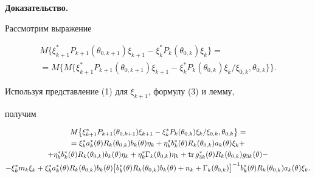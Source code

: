 {\bf Доказательство.}


Рассмотрим выражение


\begin{gather*}


M\bigl\{\xi_{k+1}^{*}P_{k+1}(\theta_{0,k+1})\xi_{k+1}-


\xi_{k}^{*}P_{k}(\theta_{0,k})\xi_{k}\bigr\}=\\


%


=M\bigl\{M\bigl\{\xi_{k+1}^{*}P_{k+1}(\theta_{0,k+1})\xi_{k+1}-


\xi_{k}^{*}P_{k}(\theta_{0,k})\xi_{k}/


\xi_{0,k},\theta_{0,k}\bigr\}\bigr\}.


\end{gather*}


Используя представление (1) для $\xi_{k+1}$, формулу (3) и лемму,


получим


\begin{gather*}


M\bigl\{\xi_{k+1}^{*}P_{k+1}(\theta_{0,k+1})\xi_{k+1}-


\xi_{k}^{*}P_{k}(\theta_{0,k})\xi_{k}/\xi_{0,k},


\theta_{0,k}\bigr\}=\\


%


=\xi_{k}^{*}a_{k}^{*}(\theta)R_{k}(\theta_{0,k})


b_{k}(\theta)\eta_{k}+


\eta_{k}^{*}b_{k}^{*}(\theta)R_{k}(\theta_{0,k})


a_{k}(\theta)\xi_{k}+\\


%


+\eta_{k}^{*}b_{k}^{*}(\theta)R_{k}(\theta_{0,k})


b_{k}(\theta)\eta_{k}


+\eta_{k}^{*}\Gamma_{k}(\theta_{0,k})\eta_{k}+


\tr g_{3k}^{*}(\theta)R_{k}(\theta_{0,k})


g_{3k}(\theta)- \\


%


-\xi_{k}^{*}m_{k}\xi_{k}+\xi_{k}^{*}a_{k}^{*}(\theta)R_{k}(\theta_{0,k})


b_{k}(\theta)


\bigl[b_{k}^{*}(\theta)R_{k}(\theta_{0,k})


b_{k}(\theta)+n_{k}+\Gamma_{k}(\theta_{0,k})\bigr]^{-1}


b_{k}^{*}(\theta)R_{k}(\theta_{0,k})


a_{k}(\theta)\xi_{k}.


\end{gather*}


